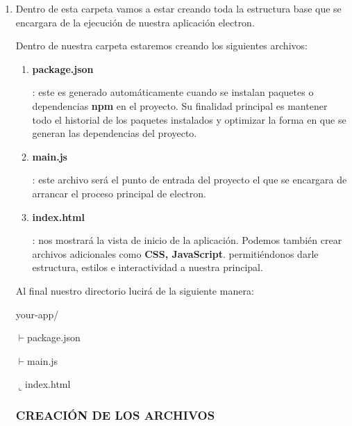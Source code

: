 \begin{enumerate}
    \item Dentro de esta carpeta vamos a estar creando toda la estructura base que se encargara de la ejecución de nuestra aplicación electron.

    Dentro de nuestra carpeta estaremos creando los siguientes archivos:
    
    \begin{enumerate}
        \item \hypertarget{package}{\textbf{package.json}}: este es generado automáticamente cuando se instalan paquetes o dependencias \textbf{npm} en el proyecto. Su finalidad principal es mantener todo el historial de los paquetes instalados y optimizar la forma en que se generan las dependencias del proyecto.
        \item \hypertarget{main}{\textbf{main.js}}: este archivo será el punto de entrada del proyecto el que se encargara de arrancar el proceso principal de electron.
        \item \hypertarget{index}{\textbf{index.html}}: nos mostrará la vista de inicio de la aplicación. Podemos también crear archivos adicionales como \textbf{CSS, JavaScript}. permitiéndonos darle estructura, estilos e interactividad a nuestra principal.
    \end{enumerate}
    
    Al final nuestro directorio lucirá de la siguiente manera:
    
    your-app/
    
    $\vdash ${package.json}
    
    $\vdash ${main.js}
    
    $\llcorner${index.html}
    \newpage
    
    \subsubsection*{CREACIÓN DE LOS ARCHIVOS}
    

\end{enumerate}
